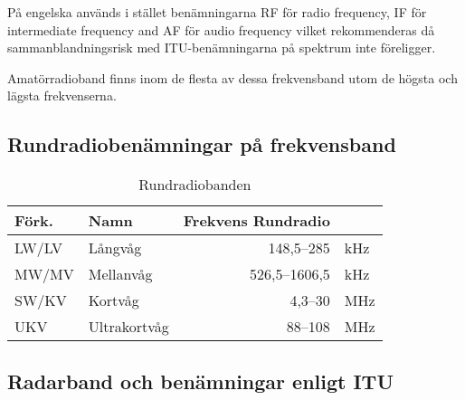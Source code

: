På engelska används i stället be\-nämn\-ing\-ar\-na RF för radio frequency, IF
för intermediate frequency and AF för audio frequency vilket rekommenderas då
sammanblandningsrisk med ITU-be\-nämn\-ing\-ar\-na på spektrum inte
föreligger.

Amatörradioband finns inom de flesta av dessa frekvensband utom de högsta och
lägsta frekvenserna.

\subsection{Rundradiobenämningar på frekvensband}

\begin{table}[H]
\centering
\begin{tabular}{llrl}
\textbf{Förk.} & \textbf{Namn} & \textbf{Frekvens Rundradio} &     \\ \hline
LW/LV          & Långvåg       & 148,5--285                  & kHz \\
MW/MV          & Mellanvåg     & 526,5--1606,5               & kHz \\
SW/KV          & Kortvåg       & 4,3--30                     & MHz \\
UKV            & Ultrakortvåg  & 88--108                     & MHz \\
\end{tabular}
\caption{Rundradiobanden}
\end{table}

\subsection{Radarband och benämningar enligt ITU}

